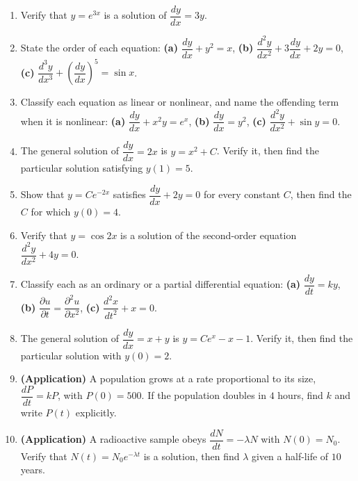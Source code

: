 \begin{enumerate}[leftmargin=2em]
    \item Verify that $y = e^{3x}$ is a solution of $\dfrac{dy}{dx} = 3y$.

    \item State the order of each equation:
          \textbf{(a)} $\dfrac{dy}{dx} + y^{2} = x$, \quad
          \textbf{(b)} $\dfrac{d^{2}y}{dx^{2}} + 3\dfrac{dy}{dx} + 2y = 0$, \quad
          \textbf{(c)} $\dfrac{d^{3}y}{dx^{3}} + \left(\dfrac{dy}{dx}\right)^{5} = \sin x$.

    \item Classify each equation as linear or nonlinear, and name the offending
          term when it is nonlinear:
          \textbf{(a)} $\dfrac{dy}{dx} + x^{2}y = e^{x}$, \quad
          \textbf{(b)} $\dfrac{dy}{dx} = y^{2}$, \quad
          \textbf{(c)} $\dfrac{d^{2}y}{dx^{2}} + \sin y = 0$.

    \item The general solution of $\dfrac{dy}{dx} = 2x$ is $y = x^{2} + C$.
          Verify it, then find the particular solution satisfying $y(1) = 5$.

    \item Show that $y = Ce^{-2x}$ satisfies $\dfrac{dy}{dx} + 2y = 0$ for every
          constant $C$, then find the $C$ for which $y(0) = 4$.

    \item Verify that $y = \cos 2x$ is a solution of the second-order equation
          $\dfrac{d^{2}y}{dx^{2}} + 4y = 0$.

    \item Classify each as an ordinary or a partial differential equation:
          \textbf{(a)} $\dfrac{dy}{dt} = ky$, \quad
          \textbf{(b)} $\dfrac{\partial u}{\partial t} = \dfrac{\partial^{2}u}{\partial x^{2}}$, \quad
          \textbf{(c)} $\dfrac{d^{2}x}{dt^{2}} + x = 0$.

    \item The general solution of $\dfrac{dy}{dx} = x + y$ is
          $y = Ce^{x} - x - 1$. Verify it, then find the particular solution
          with $y(0) = 2$.

    \item \textbf{(Application)} A population grows at a rate proportional to its
          size, $\dfrac{dP}{dt} = kP$, with $P(0) = 500$. If the population
          doubles in $4$ hours, find $k$ and write $P(t)$ explicitly.

    \item \textbf{(Application)} A radioactive sample obeys
          $\dfrac{dN}{dt} = -\lambda N$ with $N(0) = N_{0}$. Verify that
          $N(t) = N_{0}e^{-\lambda t}$ is a solution, then find $\lambda$ given
          a half-life of $10$ years.
\end{enumerate}

